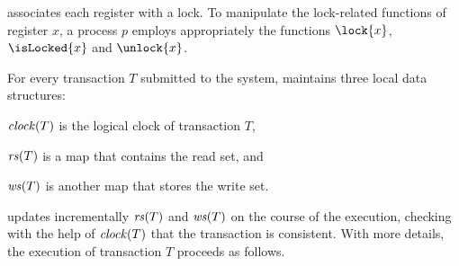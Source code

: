  associates each register with a lock.
To manipulate the lock-related functions of register $x$, 
a process $p$ employs appropriately the functions $\lock{x}$, $\isLocked{x}$ and $\unlock{x}$.

For every transaction $T$ submitted to the system,  maintains three local data structures:
\begin{inparaenum}[]
\item $\clockOf{T}$ is the logical clock of transaction $T$,
\item $\readSetOf{T}$ is a map that contains the read set, and 
\item $\writeSetOf{T}$ is another map that stores the write set.
\end{inparaenum}
 updates incrementally $\readSetOf{T}$ and $\writeSetOf{T}$ on the course of the execution, checking with the help of $\clockOf{T}$ that the transaction is consistent.
With more details, the execution of transaction $T$ proceeds as follows.

